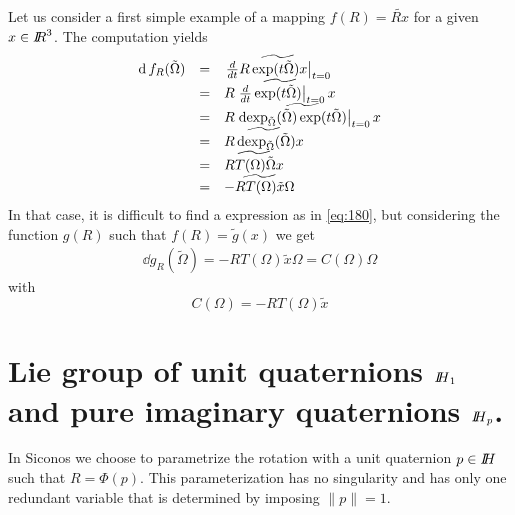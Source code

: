 Let us consider a first simple example of a mapping $f(R) = \widetilde{R  x}$ for a given $x\in\mbox{\rm $I\!\!R$}^3$. The computation yields
\begin{equation}
  \label{eq:181}
  \begin{array}{rcl}
    \operatorname{d} f_R (\tilde\Omega) &=& \widetilde{ \left.\frac{d}{dt} R \exp(t \tilde\Omega) x  \right|_{t=0}} \\
                           &=& \widetilde{R \left.\frac{d}{dt}\exp(t \tilde\Omega)\right|_{t=0}  x} \\
                           &=& \widetilde{R \left. \operatorname{dexp}_{\tilde\Omega}(\tilde\Omega)\exp(t \tilde\Omega) \right|_{t=0}  x} \\
                           &=& \widetilde{R \operatorname{dexp}_{\tilde\Omega}(\tilde\Omega) x} \\
                           &=& \widetilde{R T(\Omega) \tilde\Omega  x} \\
                           &=& \widetilde{-R T(\Omega) \tilde x \Omega } 
  \end{array}
\end{equation}
In that case, it is difficult to find a expression as in \eqref{eq:180}, but considering the function $g(R)$ such that $f(R) = \widetilde g(x)$ we get
\begin{equation}
  \label{eq:181}
  \begin{array}{rcl}
    \dd g_R (\tilde\Omega)  =- R T(\Omega) \tilde x \Omega  = C(\Omega) \Omega
  \end{array}
\end{equation}
with
\begin{equation}
  \label{eq:182}
   C(\Omega) = -R T(\Omega) \tilde x
\end{equation}


\section{Lie group of unit quaternions $\mbox{\rm $I\!\!H$}_1$ and pure imaginary quaternions $\mbox{\rm $I\!\!H$}_p$.}


In Siconos we choose to parametrize the rotation with a unit quaternion $p \in \mbox{\rm $I\!\!H$}$ such that $R = \Phi(p)$. This parameterization has no singularity and has only one redundant variable that is determined by imposing $\|p\|=1$.


